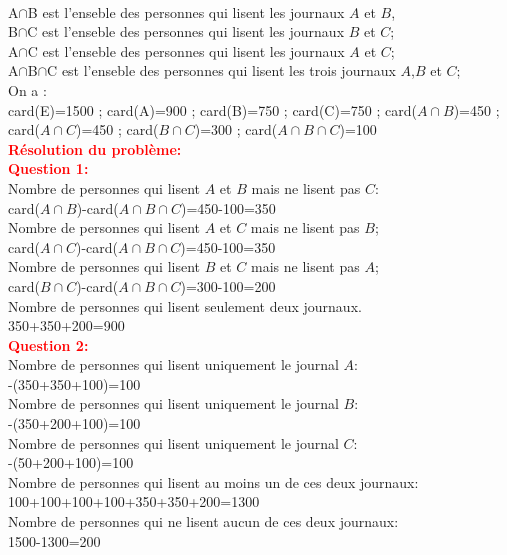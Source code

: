 \documentclass[12pt]{article}
\begin{document}
\\
A$\cap$B est l'enseble des personnes qui lisent les journaux $A$ et $B$,\\
B$\cap$C est l'enseble des personnes qui lisent les journaux $B$ et $C$;\\
A$\cap$C est l'enseble des personnes qui lisent les journaux $A$ et $C$;\\
A$\cap$B$\cap$C est l'enseble des personnes qui lisent les trois journaux $A$,$B$ et $C$;\\
On a :\\
card(E)=1500 ; card(A)=900 ; card(B)=750 ; card(C)=750 ; card($A\cap B$)=450 ; 
card($A\cap C$)=450 ; card($B\cap C$)=300 ; card($A\cap B\cap C$)=100\\
\textbf{\textcolor{red}{Résolution du problème:}}\\
\textbf{\textcolor{red}{Question 1:}}\\
Nombre de personnes qui lisent $A$ et $B$ mais ne lisent pas $C$:\\
\quad\quad card($A\cap B$)-card($A\cap B\cap C$)=450-100=350\\
Nombre de personnes qui lisent $A$ et $C$ mais ne lisent pas $B$;\\
\quad\quad card($A\cap C$)-card($A\cap B\cap C$)=450-100=350\\
Nombre de personnes qui lisent $B$ et $C$ mais ne lisent pas $A$;\\
\quad\quad card($B\cap C$)-card($A\cap B\cap C$)=300-100=200\\
Nombre de personnes qui lisent seulement deux journaux.\\
			350+350+200=900\\
\textbf{\textcolor{red}{Question 2:}}\\
Nombre de personnes qui lisent uniquement le journal $A$:\\
\quad{}-(350+350+100)=100\\
Nombre de personnes qui lisent uniquement le journal $B$:\\
\quad{}-(350+200+100)=100\\
Nombre de personnes qui lisent uniquement le journal $C$:\\
\quad{}-(50+200+100)=100\\
Nombre de personnes qui lisent au moins un de ces deux journaux:\\
100+100+100+100+350+350+200=1300\\
Nombre de personnes qui ne lisent aucun de ces deux journaux:\\
1500-1300=200
\end{document}

